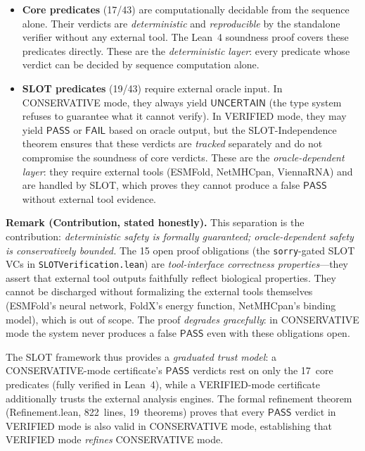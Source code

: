 \documentclass[acmsmall,review,anonymous]{acmart}
\newcommand{\PASS}{\ensuremath{\mathsf{PASS}}\xspace}
\newcommand{\FAIL}{\ensuremath{\mathsf{FAIL}}\xspace}
\newcommand{\UNCERTAIN}{\ensuremath{\mathsf{UNCERTAIN}}\xspace}
\begin{document}
\begin{itemize}[leftmargin=*,itemsep=0pt,topsep=1pt]
\item \textbf{Core predicates} (17/43) are computationally decidable
      from the sequence alone.
      Their verdicts are \emph{deterministic} and \emph{reproducible}
      by the standalone verifier without any external tool.
      The Lean~4 soundness proof covers these predicates directly.
      These are the \emph{deterministic layer}: every predicate whose
      verdict can be decided by sequence computation alone.

\item \textbf{SLOT predicates} (19/43) require external oracle input.
      In CONSERVATIVE mode, they always yield \UNCERTAIN{} (the type
      system refuses to guarantee what it cannot verify).
      In VERIFIED mode, they may yield \PASS{} or \FAIL{} based on
      oracle output, but the SLOT-Independence theorem ensures that
      these verdicts are \emph{tracked} separately and do not
      compromise the soundness of core verdicts.
      These are the \emph{oracle-dependent layer}: they require
      external tools (ESMFold, NetMHCpan, ViennaRNA) and are handled
      by SLOT, which proves they cannot produce a false \PASS{}
      without external tool evidence.
\end{itemize}

\noindent\textbf{Remark (Contribution, stated honestly).}
This separation is the contribution: \emph{deterministic safety is
formally guaranteed; oracle-dependent safety is conservatively
bounded.} The 15 open proof obligations (the \texttt{sorry}-gated
SLOT VCs in \texttt{SLOTVerification.lean}) are \emph{tool-interface
correctness properties}---they assert that external tool outputs
faithfully reflect biological properties. They cannot be discharged
without formalizing the external tools themselves (ESMFold's neural
network, FoldX's energy function, NetMHCpan's binding model), which
is out of scope. The proof \emph{degrades gracefully}: in
CONSERVATIVE mode the system never produces a false \PASS{} even with
these obligations open.

\noindent The SLOT framework thus provides a \emph{graduated trust
model}: a CONSERVATIVE-mode certificate's \PASS{} verdicts rest on
only the 17~core predicates (fully verified in Lean~4), while a
VERIFIED-mode certificate additionally trusts the external analysis
engines.
The formal refinement theorem (Refinement.lean, 822~lines,
19~theorems) proves that every \PASS{} verdict in VERIFIED mode is
also valid in CONSERVATIVE mode, establishing that VERIFIED mode
\emph{refines} CONSERVATIVE mode.
\end{document}
